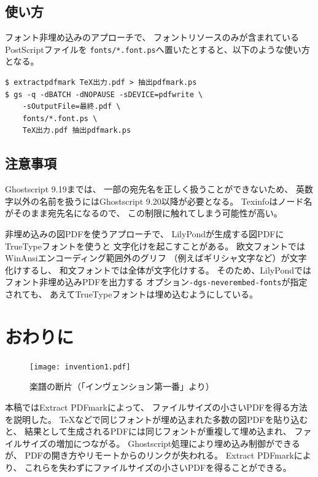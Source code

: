 \documentclass[twocolumn,jafontscale=0.962216,jlreq_notes]{jlreq}
\begin{document}
\subsection{使い方}

フォント非埋め込みのアプローチで、
フォントリソースのみが含まれているPostScriptファイルを
\verb|fonts/*.font.ps|へ置いたとすると、以下のような使い方となる。

\begin{tcolorbox}[left=0mm,right=0mm,top=0mm,bottom=0mm]
\begin{lstlisting}[basicstyle=\footnotesize\ttfamily]
$ extractpdfmark TeX出力.pdf > 抽出pdfmark.ps
$ gs -q -dBATCH -dNOPAUSE -sDEVICE=pdfwrite \
    -sOutputFile=最終.pdf \
    fonts/*.font.ps \
    TeX出力.pdf 抽出pdfmark.ps
\end{lstlisting}
\end{tcolorbox}

\subsection{注意事項}

Ghostscript 9.19までは、
一部の宛先名を正しく扱うことができない\cite{gs-919-bug}ため、
英数字以外の名前を扱うにはGhostscript 9.20以降が必要となる。
Texinfoはノード名がそのまま宛先名になるので、
この制限に触れてしまう可能性が高い。

非埋め込みの図PDFを使うアプローチで、
LilyPondが生成する図PDFにTrueTypeフォントを使うと
文字化けを起こすことがある。
欧文フォントではWinAnsiエンコーディング範囲外のグリフ
（例えばギリシャ文字など）が文字化けするし、
和文フォントでは全体が文字化けする。
そのため、LilyPondではフォント非埋め込みPDFを出力する
オプション\verb|-dgs-neverembed-fonts|が指定されても、
あえてTrueTypeフォントは埋め込むようにしている。

\section{おわりに}

\begin{figure}
  \centering
  \texttt{[image: invention1.pdf]}
  \caption{楽譜の断片（「インヴェンション第一番」より）}
  \label{fig:invention1}
\end{figure}

本稿ではExtract PDFmarkによって、
ファイルサイズの小さいPDFを得る方法を説明した。
\TeX などで同じフォントが埋め込まれた多数の図PDFを貼り込むと、
結果として生成されるPDFには同じフォントが重複して埋め込まれ、
ファイルサイズの増加につながる。
Ghostscript処理により埋め込み制御ができるが、
PDFの開き方やリモートからのリンクが失われる。
Extract PDFmarkにより、
これらを失わずにファイルサイズの小さいPDFを得ることができる。
\end{document}
